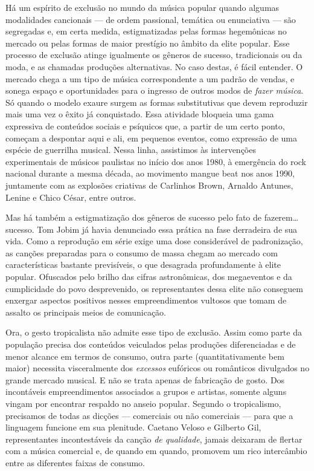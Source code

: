Há um espírito de exclusão no mundo da música popular quando algumas
modalidades cancionais --- de ordem passional, temática ou enunciativa
--- são segregadas e, em certa medida, estigmatizadas pelas formas
hegemônicas no mercado ou pelas formas de maior prestígio no âmbito da
elite popular. Esse processo de exclusão atinge igualmente os gêneros de
sucesso, tradicionais ou da moda, e as chamadas produções alternativas.
No caso destas, é fácil entender. O mercado chega a um tipo de música
correspondente a um padrão de vendas, e sonega espaço e oportunidades
para o ingresso de outros modos de \textit{fazer música}. Só quando o modelo
exaure surgem as formas substitutivas que devem reproduzir mais uma vez
o êxito já conquistado. Essa atividade bloqueia uma gama expressiva de
conteúdos sociais e psíquicos que, a partir de um certo ponto, começam a
despontar aqui e ali, em pequenos eventos, como expressão de uma espécie
de guerrilha musical. Nessa linha, assistimos às intervenções
experimentais de músicos paulistas no início dos anos 1980, à emergência
do rock nacional durante a mesma década, ao movimento mangue beat nos
anos 1990, juntamente com as explosões criativas de Carlinhos Brown,
Arnaldo Antunes, Lenine e Chico César, entre outros.

Mas há também a estigmatização dos gêneros de sucesso pelo fato de
fazerem\ldots sucesso. Tom Jobim já havia denunciado essa prática na fase
derradeira de sua vida. Como a reprodução em série exige uma dose
considerável de padronização, as canções preparadas para o consumo de
massa chegam ao mercado com características bastante previsíveis, o que
desagrada profundamente à elite popular. Ofuscados pelo brilho das
cifras astronômicas, dos megaeventos e da cumplicidade do povo
desprevenido, os representantes dessa elite não conseguem enxergar
aspectos positivos nesses empreendimentos vultosos que tomam de assalto
os principais meios de comunicação.

Ora, o gesto tropicalista não admite esse tipo de exclusão. Assim como
parte da população precisa dos conteúdos veiculados pelas produções
diferenciadas e de menor alcance em termos de consumo, outra parte
(quantitativamente bem maior) necessita visceralmente dos \textit{excessos}
eufóricos ou românticos divulgados no grande mercado musical. E não se
trata apenas de fabricação de gosto. Dos incontáveis empreendimentos
associados a grupos e artistas, somente alguns vingam por encontrar
respaldo no anseio popular. Segundo o tropicalismo, precisamos de todas
as dicções --- comerciais ou não comerciais --- para que a linguagem
funcione em sua plenitude. Caetano Veloso e Gilberto Gil, representantes
incontestáveis da canção \textit{de qualidade}, jamais deixaram de flertar
com a música comercial e, de quando em quando, promovem um rico
intercâmbio entre as diferentes faixas de consumo.

